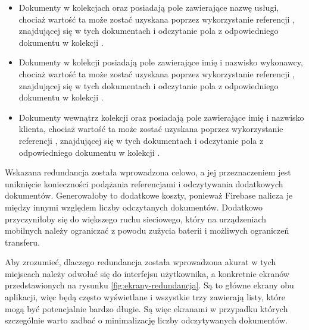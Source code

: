 
\vspace{0.5\baselineskip}

\begin{itemize}
    \item Dokumenty w kolekcjach  oraz  posiadają pole  zawierające nazwę usługi, chociaż wartość ta może zostać uzyskana poprzez wykorzystanie referencji , znajdującej się w tych dokumentach i odczytanie pola  z odpowiedniego dokumentu w kolekcji .
    \item Dokumenty w kolekcji  posiadają pole  zawierające imię i nazwisko wykonawcy, chociaż wartość ta może zostać uzyskana poprzez wykorzystanie referencji , znajdującej się w tych dokumentach i odczytanie pola  z odpowiedniego dokumentu w kolekcji .
    \item Dokumenty wewnątrz kolekcji  oraz  posiadają pole  zawierające imię i nazwisko klienta, chociaż wartość ta może zostać uzyskana poprzez wykorzystanie referencji , znajdującej się w tych dokumentach i odczytanie pola  z odpowiedniego dokumentu w kolekcji .
\end{itemize}

Wskazana redundancja została wprowadzona celowo, a jej przeznaczeniem jest uniknięcie konieczności podążania referencjami i odczytywania dodatkowych dokumentów. Generowałoby to dodatkowe koszty, ponieważ Firebase nalicza je między innymi względem liczby odczytanych dokumentów. Dodatkowo przyczyniłoby się do większego ruchu sieciowego, który na urządzeniach mobilnych należy ograniczać z powodu zużycia baterii i możliwych ograniczeń transferu.

Aby zrozumieć, dlaczego redundancja została wprowadzona akurat w tych miejscach należy odwołać się do interfejsu użytkownika, a konkretnie ekranów przedstawionych na rysunku \ref{fig:ekrany-redundancja}. Są to główne ekrany obu aplikacji, więc będą często wyświetlane i wszystkie trzy zawierają listy, które mogą być potencjalnie bardzo długie. Są więc ekranami w przypadku których szczególnie warto zadbać o minimalizację liczby odczytywanych dokumentów. 

